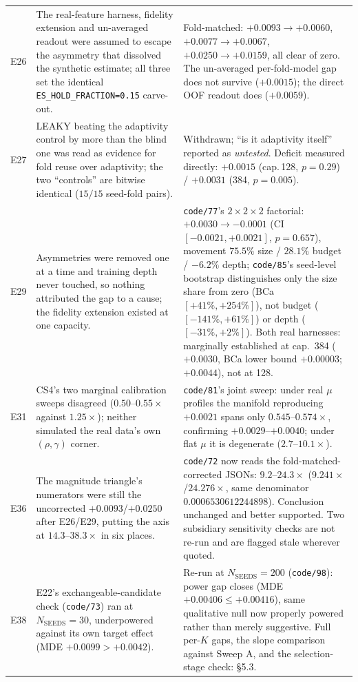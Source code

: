 \documentclass[10pt]{article} %
\begin{document}
\begin{longtable}{@{}p{}p{}p{}@{}}
E26 & The real-feature harness, fidelity extension and un-averaged readout were assumed to escape the asymmetry that dissolved the synthetic estimate; all three set the identical \texttt{ES\_HOLD\_FRACTION=0.15} carve-out. &
Fold-matched: $+0.0093\to+0.0060$, $+0.0077\to+0.0067$, $+0.0250\to+0.0159$, all clear of zero. The un-averaged per-fold-model gap does not survive ($+0.0015$); the direct OOF readout does ($+0.0059$). \\

E27 & LEAKY beating the adaptivity control by more than the blind one was read as evidence for fold reuse over adaptivity; the two ``controls'' are bitwise identical ($15/15$ seed-fold pairs). &
Withdrawn; ``is it adaptivity itself'' reported as \emph{untested}. Deficit measured directly: $+0.0015$ (cap.\,128, $p=0.29$) / $+0.0031$ (384, $p=0.005$). \\

E29 & Asymmetries were removed one at a time and training depth never touched, so nothing attributed the gap to a cause; the fidelity extension existed at one capacity. &
\texttt{code/77}'s $2\times2\times2$ factorial: $+0.0030\to-0.0001$ (CI $[-0.0021,+0.0021]$, $p=0.657$), movement $75.5\%$ size / $28.1\%$ budget / $-6.2\%$ depth; \texttt{code/85}'s seed-level bootstrap distinguishes only the size share from zero (BCa $[+41\%,+254\%]$), not budget ($[-141\%,+61\%]$) or depth ($[-31\%,+2\%]$). Both real harnesses: marginally established at cap.\ 384 ($+0.0030$, BCa lower bound $+0.00003$; $+0.0044$), not at 128. \\

E31 & CS4's two marginal calibration sweeps disagreed ($0.50$--$0.55\times$ against $1.25\times$); neither simulated the real data's own $(\rho,\gamma)$ corner. &
\texttt{code/81}'s joint sweep: under real $\mu$ profiles the manifold reproducing $+0.0021$ spans only $0.545$--$0.574\times$, confirming $+0.0029$--$+0.0040$; under flat $\mu$ it is degenerate ($2.7$--$10.1\times$). \\

E36 & The magnitude triangle's numerators were still the uncorrected $+0.0093$/$+0.0250$ after E26/E29, putting the axis at $14.3$--$38.3\times$ in six places. &
\texttt{code/72} now reads the fold-matched-corrected JSONs: $9.2$--$24.3\times$ ($9.241\times$/$24.276\times$, same denominator $0.0006530612244898$). Conclusion unchanged and better supported. Two subsidiary sensitivity checks are not re-run and are flagged stale wherever quoted. \\

E38 & E22's exchangeable-candidate check (\texttt{code/73}) ran at $N_{\text{SEEDS}}=30$, underpowered against its own target effect (MDE $+0.0099>+0.0042$). &
Re-run at $N_{\text{SEEDS}}=200$ (\texttt{code/98}): power gap closes (MDE $+0.00406\leq+0.00416$), same qualitative null now properly powered rather than merely suggestive. Full per-$K$ gaps, the slope comparison against Sweep A, and the selection-stage check: §5.3. \\

\end{longtable}
\normalsize
\end{document}
